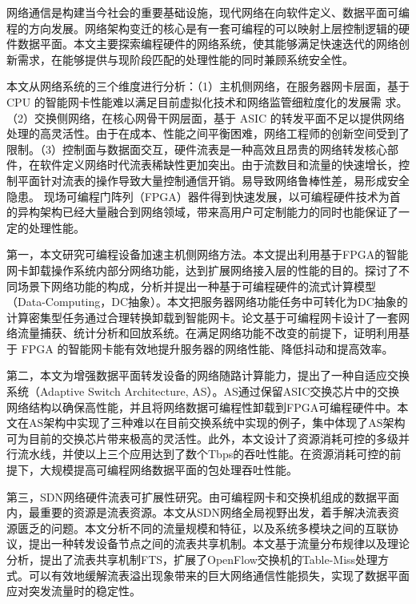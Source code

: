 
\label{chap6}

\label{chap61}

网络通信是构建当今社会的重要基础设施，现代网络在向软件定义、数据平面可编程的方向发展。网络架构变迁的核心是有一套可编程的可以映射上层控制逻辑的硬件数据平面。本文主要探索编程硬件的网络系统，使其能够满足快速迭代的网络创新需求，在能够提供与现阶段匹配的处理性能的同时兼顾系统安全性。

本文从网络系统的三个维度进行分析：（1）主机侧网络，在服务器网卡层面，基于 CPU 的智能网卡性能难以满足目前虚拟化技术和网络监管细粒度化的发展需
求。（2）交换侧网络，在核心网骨干网层面，基于 ASIC 的转发平面不足以提供网络处理的高灵活性。由于在成本、性能之间平衡困难，网络工程师的创新空间受到了限制。（3）控制面与数据面交互，硬件流表是一种高效且昂贵的网络转发核心部件，在软件定义网络时代流表稀缺性更加突出。由于流数目和流量的快速增长，控制平面针对流表的操作导致大量控制通信开销。易导致网络鲁棒性差，易形成安全隐患。
现场可编程门阵列（FPGA）器件得到快速发展，以可编程硬件技术为首的异构架构已经大量融合到网络领域，带来高用户可定制能力的同时也能保证了一定的处理性能。

第一，本文研究可编程设备加速主机侧网络方法。本文提出利用基于FPGA的智能网卡卸载操作系统内部分网络功能，达到扩展网络接入层的性能的目的。探讨了不同场景下网络功能的构成，分析并提出一种基于可编程硬件的流式计算模型（Data-Computing，DC抽象）。本文把服务器网络功能任务中可转化为DC抽象的计算密集型任务通过合理转换卸载到智能网卡。论文基于可编程网卡设计了一套网络流量捕获、统计分析和回放系统。在满足网络功能不改变的前提下，证明利用基于 FPGA 的智能网卡能有效地提升服务器的网络性能、降低抖动和提高效率。

第二，本文为增强数据平面转发设备的网络随路计算能力，提出了一种自适应交换系统（Adaptive Switch Architecture, AS）。AS通过保留ASIC交换芯片中的交换网络结构以确保高性能，并且将网络数据可编程性卸载到FPGA可编程硬件中。本文在AS架构中实现了三种难以在目前交换系统中实现的例子，集中体现了AS架构可为目前的交换芯片带来极高的灵活性。此外，本文设计了资源消耗可控的多级并行流水线，并使以上三个应用达到了数个Tbps的吞吐性能。在资源消耗可控的前提下，大规模提高可编程网络数据平面的包处理吞吐性能。

第三，SDN网络硬件流表可扩展性研究。由可编程网卡和交换机组成的数据平面内，最重要的资源是流表资源。本文从SDN网络全局视野出发，着手解决流表资源匮乏的问题。本文分析不同的流量规模和特征，以及系统多模块之间的互联协议，提出一种转发设备节点之间的流表共享机制。本文基于流量分布规律以及理论分析，提出了流表共享机制FTS，扩展了OpenFlow交换机的Table-Miss处理方式。可以有效地缓解流表溢出现象带来的巨大网络通信性能损失，实现了数据平面应对突发流量时的稳定性。

